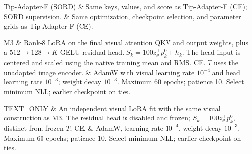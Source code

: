 Tip-Adapter-F (SORD) &
Same keys, values, and score as Tip-Adapter-F (CE); SORD supervision. &
Same optimization, checkpoint selection, and parameter grids as Tip-Adapter-F (CE).\\
\addlinespace[2pt]

M3 &
Rank-8 LoRA on the final visual attention QKV and output weights, plus a $512\to128\to K$ GELU residual head.
$S_k=100z_\theta^\top p_k^0+h_k$.
The head input is centered and scaled using the native training mean and RMS.
CE.
$T$ uses the unadapted image encoder. &
AdamW with visual learning rate $10^{-4}$ and head learning rate $10^{-3}$; weight decay $10^{-3}$.
Maximum 60 epochs; patience 10.
Select minimum NLL; earlier checkpoint on ties.\\
\addlinespace[2pt]

TEXT\_ONLY &
An independent visual LoRA fit with the same visual construction as M3.
The residual head is disabled and frozen; $S_k=100z_\theta^\top p_k^0$, distinct from frozen $T$; CE. &
AdamW, learning rate $10^{-4}$, weight decay $10^{-3}$.
Maximum 60 epochs; patience 10.
Select minimum NLL; earlier checkpoint on ties.\\
\bottomrule
